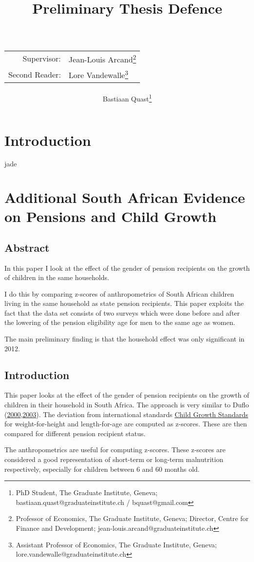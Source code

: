 \documentclass[a4paper]{book}\usepackage{graphicx, color}
\title{Preliminary Thesis Defence\\~\\
\begin{tabular}{rl}
Supervisor:&Jean-Louis Arcand\footnote{Professor of Economics, The Graduate Institute, Geneva; Director, Centre for Finance and Development; jean-louis.arcand@graduateinstitute.ch}\\
Second Reader:&Lore Vandewalle\footnote{Assistant Professor of Economics, The Graduate Institute, Geneva; lore.vandewalle@graduateinstitute.ch}
\end{tabular}
}
\author{Bastiaan Quast\thanks{PhD Student, The Graduate Institute, Geneva; bastiaan.quast@graduateinstitute.ch / bquast@gmail.com}}
\begin{document}
\frontmatter
\maketitle
\tableofcontents

\chapter{Introduction}
jade

\mainmatter

\chapter{Additional South African Evidence on Pensions and Child Growth}

\section*{Abstract}

In this paper I look at the effect of the gender of pension recipients
on the growth of children in the same households.

I do this by comparing z-scores of anthropometrics of South African
children living in the same household as state pension recipients. This
paper exploits the fact that the data set consists of two surveys which
were done before and after the lowering of the pension eligibility age
for men to the same age as women.

The main preliminary finding is that the household effect was only
significant in 2012.

\section{Introduction}

This paper looks at the effect of the gender of pension recipients on
the growth of children in their household in South Africa. The approach
is very similar to Duflo
(\href{http://www.jstor.org/discover/10.2307/117257}{2000},\href{http://wber.oxfordjournals.org/content/17/1/1}{2003}).
The deviation from international standards
\href{http://www.who.int/childgrowth/en/}{Child Growth Standards} for
weight-for-height and length-for-age are computed as z-scores. These are
then compared for different pension recipient status.

The anthropometrics are useful for computing z-scores. These z-scores
are considered a good representation of short-term or long-term
malnutrition respectively, especially for children between 6 and 60
months old.
\end{document}
